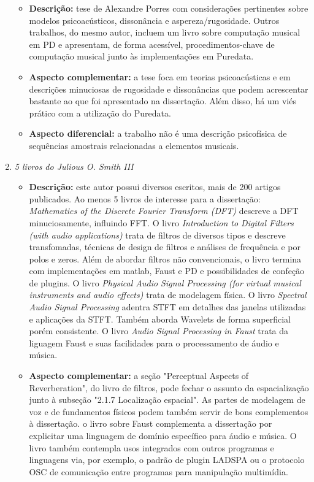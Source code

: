 \begin{enumerate}
\begin{itemize}
            \item {\bf Descrição:} tese de Alexandre Porres com considerações pertinentes sobre modelos psicoacústicos, dissonância e aspereza/rugosidade. Outros trabalhos, do mesmo autor, incluem um livro sobre computação musical em PD e apresentam, de forma acessível, procedimentos-chave de computação musical junto às implementações em Puredata.
            \item {\bf Aspecto complementar:} a tese foca em teorias psicoacústicas e em descrições minuciosas de rugosidade e dissonâncias que podem acrescentar bastante ao que foi apresentado na dissertação. Além disso, há um viés prático com a utilização do Puredata.
            \item {\bf Aspecto diferencial:} a trabalho não é uma descrição psicofísica de sequências amostrais relacionadas a elementos musicais.
        \end{itemize}
    \item \emph{5 livros do Julious O. Smith III}\cite{JOSFaust,JOSSpec,JOSFilt,JOSPhy,JOSFM}
        \begin{itemize}
            \item {\bf Descrição:} este autor possui diversos escritos, mais de 200 artigos publicados. Ao menos 5 livros de interesse para a dissertação: \emph{Mathematics of the Discrete Fourier Transform (DFT)} descreve a DFT minuciosamente, influindo FFT. O livro \emph{Introduction to Digital Filters (with audio applications)} trata de filtros de diversos tipos e descreve transfomadas, técnicas de design de filtros e análises de frequência e por polos e zeros. Além de abordar filtros não convencionais, o livro termina com implementações em matlab, Faust e PD e possibilidades de confeção de plugins. O livro \emph{Physical Audio Signal Processing (for virtual musical instruments and audio effects)} trata de modelagem física. O livro \emph{Spectral Audio Signal Processing} adentra STFT em detalhes das janelas utilizadas e aplicações da STFT. Também aborda Wavelets de forma superficial porém consistente. O livro \emph{Audio Signal Processing in Faust} trata da liguagem Faust e suas facilidades para o processamento de áudio e música.
            \item {\bf Aspecto complementar:} a seção "Perceptual Aspects of Reverberation", do livro de filtros, pode fechar o assunto da espacialização junto à subseção "2.1.7 Localização espacial". As partes de modelagem de voz e de fundamentos físicos podem também servir de bons  complementos à dissertação. o livro sobre Faust complementa a dissertação por explicitar uma linguagem de domínio específico para áudio e música. O livro também contempla usos integrados com outros programas e linguagens via, por exemplo, o padrão de plugin LADSPA ou o protocolo OSC de comunicação entre programas para manipulação multimídia. 

\end{itemize}
\end{enumerate}
